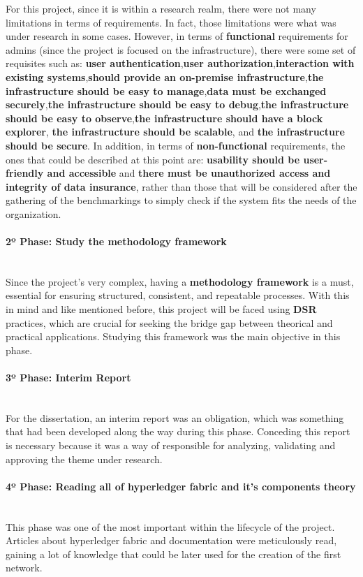 For this project, since it is within a research realm, there were not many limitations in terms of requirements. In fact, those limitations were what was under research in some cases. However, in terms of \textbf{functional} requirements for admins (since the project is focused on the infrastructure), there were some set of requisites such as: \textbf{user authentication},\textbf{user authorization},\textbf{interaction with existing systems},\textbf{should provide an on-premise infrastructure},\textbf{the infrastructure should be easy to manage},\textbf{data must be exchanged securely},\textbf{the infrastructure should be easy to debug},\textbf{the infrastructure should be easy to observe},\textbf{the infrastructure should have a block explorer},\textbf{ the infrastructure should be scalable}, and \textbf{the infrastructure should be secure}. In addition, in terms of \textbf{non-functional} requirements, the ones that could be described at this point are: \textbf{usability should be user-friendly and accessible} and \textbf{there must be unauthorized access and integrity of data insurance}, rather than those that will be considered after the gathering of the benchmarkings to simply check if the system fits the needs of the organization.

\paragraph{2º Phase: Study the methodology framework}\mbox{}\\
Since the project's very complex, having a \textbf{methodology framework} is a must, essential for ensuring structured, consistent, and repeatable processes. With this in mind and like mentioned before, this project will be faced using \textbf{DSR} practices, which are crucial for seeking the bridge gap between theorical and practical applications. Studying this framework was the main objective in this phase.

\paragraph{3º Phase: Interim Report} \mbox{}\\
For the dissertation, an interim report was an obligation, which was something that had been developed along the way during this phase. Conceding this report is necessary because it was a way of responsible for analyzing, validating and approving the theme under research.

\paragraph{4º Phase: Reading all of hyperledger fabric and it's components theory}\mbox{}\\
This phase was one of the most important within the lifecycle of the project. Articles about hyperledger fabric and documentation were meticulously read, gaining a lot of knowledge that could be later used for the creation of the first network.

